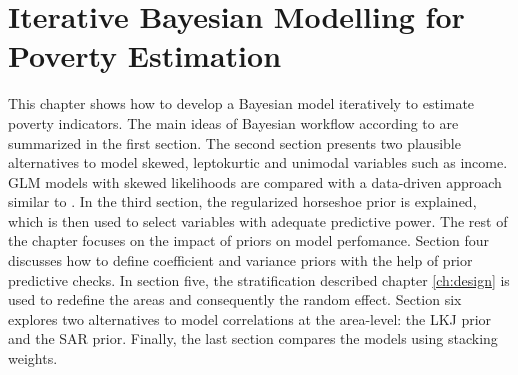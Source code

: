 \chapter{Iterative Bayesian Modelling for Poverty Estimation}

\label{ch:workflow}

This chapter shows how to develop a Bayesian model iteratively to estimate poverty indicators.
The main ideas of Bayesian workflow according to \cite{gelman_bayesian_2020} are summarized in the first section.
The second section presents two plausible alternatives to model skewed, leptokurtic and unimodal variables such as income. GLM models with skewed likelihoods are compared with a data-driven approach similar to \cite{morelli_hierarchical_2021}.
In the third section, the regularized horseshoe prior is explained, which is then used to select variables with adequate predictive power.
The rest of the chapter focuses on the impact of priors on model perfomance.
Section four discusses how to define coefficient and variance priors with the help of prior predictive checks.
In section five, the stratification described chapter \ref{ch:design} is used to redefine the areas and consequently the random effect.
Section six explores two alternatives to model correlations at the area-level: the LKJ prior and the SAR prior.
Finally, the last section compares the models using stacking weights.









